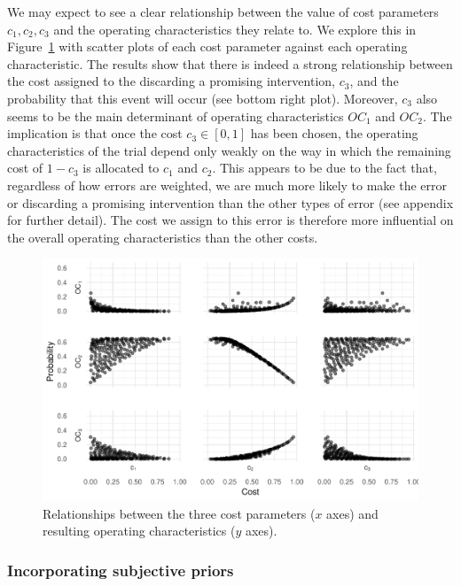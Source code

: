 \documentclass{article} %
\begin{document}
We may expect to see a clear relationship between the value of cost parameters $c_1, c_2, c_3$ and the operating characteristics they relate to. We explore this in Figure~\ref{fig:cost_OCs} with scatter plots of each cost parameter against each operating characteristic. The results show that there is indeed a strong relationship between the cost assigned to the discarding a promising intervention, $c_3$, and the probability that this event will occur (see bottom right plot). Moreover, $c_3$ also seems to be the main determinant of operating characteristics $OC_1$ and $OC_2$. The implication is that once the cost $c_3 \in [0,1]$ has been chosen, the operating characteristics of the trial depend only weakly on the way in which the remaining cost of $1-c_3$ is allocated to $c_1$ and $c_2$. This appears to be due to the fact that, regardless of how errors are weighted, we are much more likely to make the error or discarding a promising intervention than the other types of error (see appendix for further detail). The cost we assign to this error is therefore more influential on the overall operating characteristics than the other costs.

\begin{figure}
\centering
\includegraphics[scale=0.8]{./Figures/cost_OCs}
\caption{Relationships between the three cost parameters ($x$ axes) and resulting operating characteristics ($y$ axes).}
\label{fig:cost_OCs}
\end{figure}

\subsubsection{Incorporating subjective priors}
\end{document}
